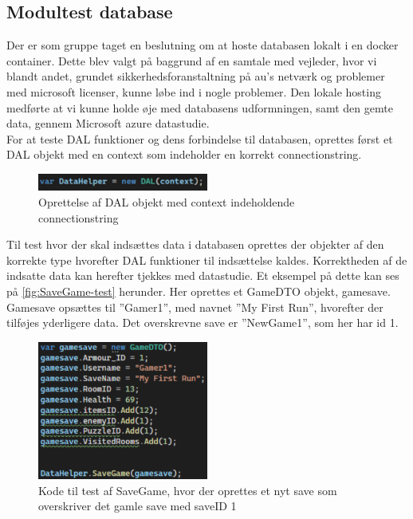 \subsection{Modultest database}
\label{ssec: Modultest database}
Der er som gruppe taget en beslutning om at hoste databasen lokalt i en docker container. Dette blev valgt på baggrund af en samtale med vejleder, hvor vi blandt andet, grundet sikkerhedsforanstaltning på au’s netværk og problemer med microsoft licenser, kunne løbe ind i nogle problemer.
Den lokale hosting medførte at vi kunne holde øje med databasens udformningen, samt den gemte data, gennem Microsoft azure datastudie.\\

For at teste DAL funktioner og dens forbindelse til databasen, oprettes først et DAL objekt med en context som indeholder en korrekt connectionstring.
\begin{figure}[H]
\centering
\includegraphics[width = 0.5\textwidth]{02-Body/Images/DAL-Database/DataHelper.png}
\caption{Oprettelse af DAL objekt med context indeholdende connectionstring}
\label{fig:Datahelper}
\end{figure}

Til test hvor der skal indsættes data i databasen oprettes der objekter af den korrekte type hvorefter DAL funktioner til indsættelse kaldes. Korrektheden af de indsatte data kan herefter tjekkes med datastudie.
Et eksempel på dette kan ses på \autoref{fig:SaveGame-test} herunder.
Her oprettes et GameDTO objekt, gamesave.\\
Gamesave opsættes til ”Gamer1”, med navnet ”My First Run”, hvorefter der tilføjes yderligere data. Det overskrevne save er ”NewGame1”, som her har id 1.

\begin{figure}[H]
\centering
\includegraphics[width = 0.5\textwidth]{02-Body/Images/DAL-Database/NewSave-Test.png}
\caption{Kode til test af SaveGame, hvor der oprettes et nyt save som overskriver det gamle save med saveID 1}
\label{fig:SaveGame-test}
\end{figure}

